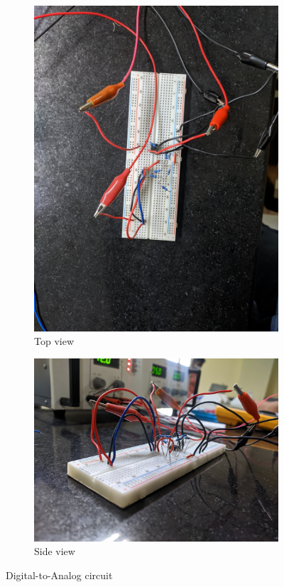 \documentclass[%
 reprint,
nofootinbib,
 amsmath,amssymb,
 aps,
floatfix,
]{revtex4-2}
\begin{document}
    \begin{figure}
        \centering
        \begin{subfigure}[b]{0.3\textwidth}
            \centering
            \includegraphics[width=\textwidth]{Figures/1.jpg}
            \caption{Top view}
            \label{fig:y equals x}
        \end{subfigure}
        \hfill
        \begin{subfigure}[b]{0.3\textwidth}
            \centering
            \includegraphics[width=\textwidth]{Figures/2.jpg}
            \caption{Side view}
            \label{fig:three sin x}
        \end{subfigure}
        \caption{Digital-to-Analog circuit}
    \end{figure}
\end{document}
